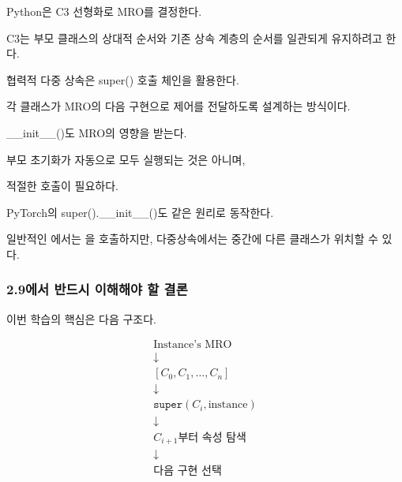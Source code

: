 \begin{dhknote}
\begin{dhksmry}[centered]
Python은 C3 선형화로 MRO를 결정한다.
\end{dhksmry}
\end{dhknote}

C3는 부모 클래스의 상대적 순서와 기존 상속 계층의 순서를 일관되게 유지하려고 한다.

\begin{dhknote}
\begin{dhksmry}[centered]
협력적 다중 상속은 super() 호출 체인을 활용한다.
\end{dhksmry}
\end{dhknote}

각 클래스가 MRO의 다음 구현으로 제어를 전달하도록 설계하는 방식이다.

\begin{dhknote}
\begin{dhksmry}[centered]
__init__()도 MRO의 영향을 받는다.
\end{dhksmry}
\end{dhknote}

부모 초기화가 자동으로 모두 실행되는 것은 아니며,

적절한  호출이 필요하다.

\begin{dhknote}
\begin{dhksmry}[centered]
PyTorch의 super().__init__()도 같은 원리로 동작한다.
\end{dhksmry}
\end{dhknote}

일반적인 에서는 을 호출하지만, 다중상속에서는 중간에 다른 클래스가 위치할 수 있다.

\subsubsection{2.9에서 반드시 이해해야 할 결론}

이번 학습의 핵심은 다음 구조다.

\[
\boxed{
\begin{gathered}
\text{Instance's MRO}\\
\downarrow\\
[C_0,C_1,\ldots,C_n]\\
\downarrow\\
\texttt{super}(C_i,\text{instance})\\
\downarrow\\
C_{i+1}\text{부터 속성 탐색}\\
\downarrow\\
\text{다음 구현 선택}
\end{gathered}
}
\]

